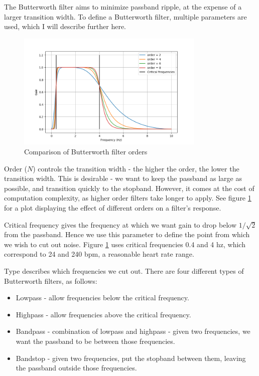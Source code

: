 \documentclass[12pt,a4paper,twoside,openright]{report}
\begin{document}
The Butterworth filter aims to minimize passband ripple, at the expense of a
larger transition width. To define a Butterworth filter, multiple parameters
are used, which I will describe further here.

\begin{figure}[h]
	\centerline{\includegraphics[width=0.8\textwidth]{figs/butter-order-comparison.png}}
\caption{Comparison of Butterworth filter orders}
\label{fig:butterworth-order}
\end{figure}

Order (\(N\)) controls the transition width - the higher the order, the lower
the transition width. This is desirable - we want to keep the passband as
large as possible, and transition quickly to the stopband. However, it comes
at the cost of computation complexity, as higher order filters take longer to
apply. See figure \ref{fig:butterworth-order} for a plot displaying the effect
of different orders on a filter's response.

Critical frequency gives the frequency at which we want gain to drop below
\(1/\sqrt2\) from the passband. Hence we use this parameter to define the
point from which we wish to cut out noise. Figure \ref{fig:butterworth-order}
uses critical frequencies 0.4 and 4 hz, which correspond to 24 and 240 bpm, a
reasonable heart rate range.

Type describes which frequencies we cut out. There are four different
types of Butterworth filters, as follows:

\begin{itemize}
	\item Lowpass - allow frequencies below the critical frequency.

	\item Highpass - allow frequencies above the critical frequency.

	\item Bandpass - combination of lowpass and highpass - given two
		frequencies, we want the passband to be between those
		frequencies.

	\item Bandstop - given two frequencies, put the stopband between them,
		leaving the passband outside those frequencies.
\end{itemize}
\end{document}

